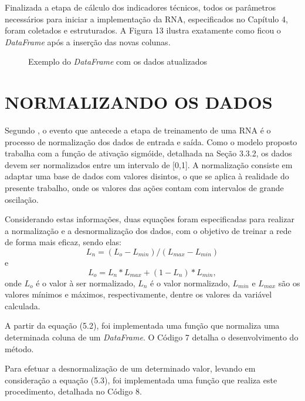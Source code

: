 Finalizada a etapa de cálculo dos indicadores técnicos, todos os parâmetros necessários para iniciar a implementação da RNA, especificados no Capítulo 4, foram coletados e estruturados. A Figura 13 ilustra exatamente como ficou o \textit{DataFrame} após a inserção das novas colunas.
\begin{figure}[h]
	\centering
	\caption{Exemplo do \textit{DataFrame} com os dados atualizados}
	\label{exec-dados-formatados}	
\end{figure}

\section{NORMALIZANDO OS DADOS}
Segundo , o evento que antecede a etapa de treinamento de uma RNA é o processo de normalização dos dados de entrada e saída. Como o modelo proposto trabalha com a função de ativação sigmóide, detalhada na Seção 3.3.2, os dados devem ser normalizados entre um intervalo de [0,1]. A normalização consiste em adaptar uma base de dados com valores disintos, o que se aplica à realidade do presente trabalho, onde os valores das ações contam com intervalos de grande oscilação.

Considerando estas informações, duas equações foram especificadas para realizar a normalização e a desnormalização dos dados, com o objetivo de treinar a rede de forma mais eficaz, sendo elas:
\begin{equation}\label{eq:eq-normalizacao}
L_n = (L_o - L_{min}) / (L_{max} - L_{min})
\end{equation}
e
\begin{equation}\label{eq:eq-desnormalizacao}
L_o =  L_n * L_{max} + (1 - L_n) * L_{min},
\end{equation}
onde $L_o$ é o valor à ser normalizado, $L_n$ é o valor normalizado, $L_{min}$ e $L_{max}$ são os valores mínimos e máximos, respectivamente, dentre os valores da variável calculada.

A partir da equação (5.2), foi implementada uma função que normaliza uma determinada coluna de um \textit{DataFrame}. O Código 7 detalha o desenvolvimento do método.


Para efetuar a desnormalização de um determinado valor, levando em consideração a equação (5.3), foi implementada uma função que realiza este procedimento, detalhada no Código 8.
  

